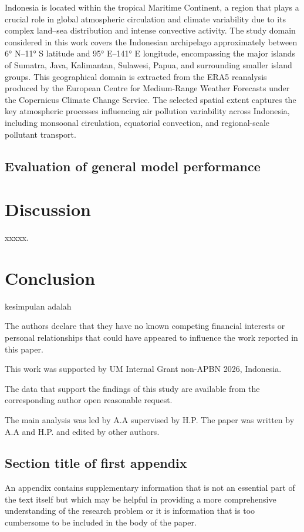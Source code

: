 \documentclass[pdflatex,sn-mathphys-num]{sn-jnl}%
\theoremstyle{thmstyleone}%
\theoremstyle{thmstyletwo}%
\theoremstyle{thmstylethree}%
\begin{document}
Indonesia is located within the tropical Maritime Continent, a region that plays a crucial role in global atmospheric circulation and climate variability due to its complex land–sea distribution and intense convective activity. The study domain considered in this work covers the Indonesian archipelago approximately between 6° N–11° S latitude and 95° E–141° E longitude, encompassing the major islands of Sumatra, Java, Kalimantan, Sulawesi, Papua, and surrounding smaller island groups. This geographical domain is extracted from the ERA5 reanalysis produced by the European Centre for Medium-Range Weather Forecasts under the Copernicus Climate Change Service. The selected spatial extent captures the key atmospheric processes influencing air pollution variability across Indonesia, including monsoonal circulation, equatorial convection, and regional-scale pollutant transport.

\subsection{Evaluation of general model performance}

\section{Discussion}\label{sec4}
xxxxx.

\section{Conclusion}\label{sec5}
kesimpulan adalah

\backmatter

The authors declare that they have no known competing financial interests or personal relationships that could have appeared to influence the work reported in this paper.

This work was supported by UM Internal Grant non-APBN 2026, Indonesia.

The data that support the findings of this study are available from the corresponding author open reasonable request.

The main analysis was led by A.A supervised by H.P. The paper was written by A.A and H.P. and edited by other authors.

\begin{appendices}

\section{Section title of first appendix}\label{secA1}

An appendix contains supplementary information that is not an essential part of the text itself but which may be helpful in providing a more comprehensive understanding of the research problem or it is information that is too cumbersome to be included in the body of the paper.


\end{appendices}

        
\end{document}
